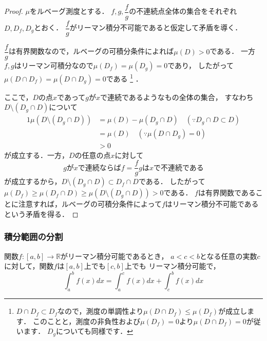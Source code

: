 \documentclass[./index]{subfiles}
\begin{document}
\begin{proof}
    $\mu$をルベーグ測度とする．
    $f, g, \dfrac{f}{g}$の不連続点全体の集合をそれぞれ$D, D_f, D_g$とおく．
    $\dfrac{f}{g}$がリーマン積分不可能であると仮定して矛盾を導く．

    $\dfrac{f}{g}$は有界関数なので，ルベーグの可積分条件によれば$\mu(D) > 0$である．
    一方$f, g$はリーマン可積分なので$\mu(D_f) = \mu(D_g) = 0$であり，
    したがって$\mu(D \cap D_f) = \mu(D \cap D_g) = 0$である
    \footnote{
        $D \cap D_f \subset D_f$なので，測度の単調性より$\mu(D \cap D_f) \le \mu(D_f)$が成立します．
        このことと，測度の非負性および$\mu(D_f) = 0$より$\mu(D \cap D_f) = 0$が従います．
        $D_g$についても同様です．
    }
    ．

    ここで，$D$の点$x$であって$g$が$x$で連続であるようなもの全体の集合，
    すなわち$D \setminus (D_g \cap D)$について
    \begin{alignat}{1}
        \mu(D \setminus (D_g \cap D)) &= \mu(D) - \mu(D_g \cap D) \quad (\because D_g \cap D \subset D) \\
        &= \mu(D) \quad (\because \mu(D \cap D_g) = 0)\\
        &> 0
    \end{alignat}
    が成立する．一方，$D$の任意の点$x$に対して
    \begin{equation}
        \mbox{$g$が$x$で連続ならば$f = \dfrac{f}{g} g$は$x$で不連続である}
    \end{equation}
    が成立するから，$D \setminus (D_g \cap D) \subset D_f \cap D$である．
    したがって$\mu(D_f) \ge \mu(D_f \cap D) \ge \mu(D \setminus (D_g \cap D)) > 0$である．
    $f$は有界関数であることに注意すれば，ルベーグの可積分条件によって$f$はリーマン積分不可能であるという矛盾を得る．
\end{proof}

\subsubsection{積分範囲の分割}

\begin{screen}
    \begin{proposition}
        関数$f: [a, b] \rightarrow \mathbb{R}$がリーマン積分可能であるとき，
        $a < c < b$となる任意の実数$c$に対して，関数$f$は$[a, b]$上でも$[c, b]$上でも
        リーマン積分可能で，
        \begin{equation}
            \int_a^b f(x) dx = \int_a^c f(x) dx + \int_c^b f(x) dx
        \end{equation}
    \end{proposition}
\end{screen}
\end{document}
